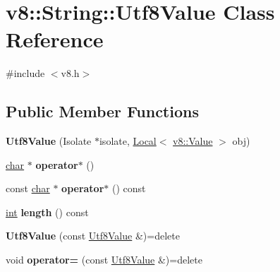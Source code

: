 \hypertarget{classv8_1_1String_1_1Utf8Value}{}\section{v8\+:\+:String\+:\+:Utf8\+Value Class Reference}
\label{classv8_1_1String_1_1Utf8Value}


{\ttfamily \#include $<$v8.\+h$>$}

\subsection*{Public Member Functions}
\begin{DoxyCompactItemize}
\item 
\mbox{\label{classv8_1_1String_1_1Utf8Value_a6dd031d0040e83fc7ffc4b4a1c990654}} 
{\bfseries Utf8\+Value} (Isolate $\ast$isolate, \mbox{\hyperlink{classv8_1_1Local}{Local}}$<$ \mbox{\hyperlink{classv8_1_1Value}{v8\+::\+Value}} $>$ obj)
\item 
\mbox{\label{classv8_1_1String_1_1Utf8Value_a6cb4914bc426bbe60b0dfdff32213e59}} 
\mbox{\hyperlink{classchar}{char}} $\ast$ {\bfseries operator$\ast$} ()
\item 
\mbox{\label{classv8_1_1String_1_1Utf8Value_af482ca665c7b8f84a1ba148b8be8f36e}} 
const \mbox{\hyperlink{classchar}{char}} $\ast$ {\bfseries operator$\ast$} () const
\item 
\mbox{\label{classv8_1_1String_1_1Utf8Value_acf903e28f4aa775e3dbe3a73161fdcbc}} 
\mbox{\hyperlink{classint}{int}} {\bfseries length} () const
\item 
\mbox{\label{classv8_1_1String_1_1Utf8Value_a8a9d1b3ccc59550ecb288eea858dc060}} 
{\bfseries Utf8\+Value} (const \mbox{\hyperlink{classv8_1_1String_1_1Utf8Value}{Utf8\+Value}} \&)=delete
\item 
\mbox{\label{classv8_1_1String_1_1Utf8Value_abb5e79454b29d2b43eeab50baeff377b}} 
void {\bfseries operator=} (const \mbox{\hyperlink{classv8_1_1String_1_1Utf8Value}{Utf8\+Value}} \&)=delete
\end{DoxyCompactItemize}


